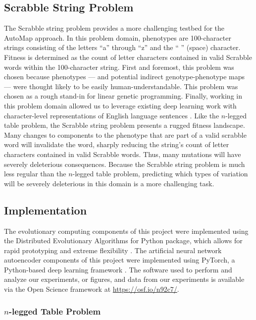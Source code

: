 \subsection{Scrabble String Problem}

The Scrabble string problem provides a more challenging testbed for the AutoMap approach.
In this problem domain, phenotypes are 100-character strings consisting of the letters ``a'' through ``z'' and the `` '' (space) character.
Fitness is determined as the count of letter characters contained in valid Scrabble words within the 100-character string.
First and foremost, this problem was chosen because phenotypes --- and potential indirect genotype-phenotype maps --- were thought likely to be easily human-understandable.
This problem was chosen as a rough stand-in for linear genetic programming.
Finally, working in this problem domain allowed us to leverage existing deep learning work with character-level representations of English language sentences \cite{weiss2016spelling}.
Like the $n$-legged table problem, the Scrabble string problem presents a rugged fitness landscape.
Many changes to components to the phenotype that are part of a valid scrabble word will invalidate the word, sharply reducing the string's count of letter characters contained in valid Scrabble words.
Thus, many mutations will have severely deleterious consequences.
Because the Scrabble string problem is much less regular than the $n$-legged table problem, predicting which types of variation will be severely deleterious in this domain is a more challenging task.

\subsection{Implementation}

The evolutionary computing components of this project were implemented using the Distributed Evolutionary Algorithms for Python package, which allows for rapid prototyping and extreme flexibility \cite{fortin2012deap}.
The artificial neural network autoencoder components of this project were implemented using PyTorch, a Python-based deep learning framework \cite{paszke2017pytorch}.
The software used to perform and analyze our experiments, or figures, and data from our experiments is available via the Open Science framework at \url{https://osf.io/n92c7/}.

\subsubsection{$n$-legged Table Problem}

